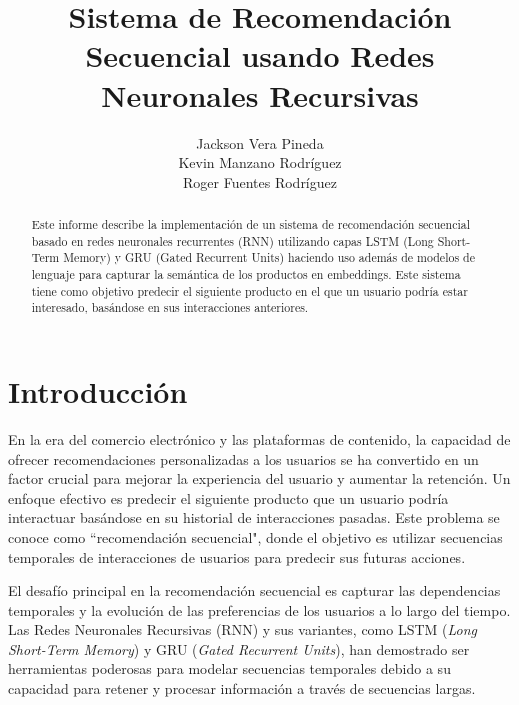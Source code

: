 \documentclass[runningheads]{llncs}
\begin{document}
\title{Sistema de Recomendación Secuencial usando Redes Neuronales Recursivas}
\author{Jackson Vera Pineda \\ Kevin Manzano Rodríguez \\ Roger Fuentes Rodríguez}

\maketitle

\begin{abstract}
Este informe describe la implementación de un sistema de recomendación secuencial basado en redes neuronales recurrentes (RNN) utilizando capas LSTM (Long Short-Term Memory) y GRU (Gated Recurrent Units) haciendo uso además de modelos de lenguaje para capturar la semántica de los productos en embeddings. Este sistema tiene como objetivo predecir el siguiente producto en el que un usuario podría estar interesado, basándose en sus interacciones anteriores.
\end{abstract}

\section{Introducción}

\space En la era del comercio electrónico y las plataformas de contenido, la capacidad de ofrecer recomendaciones personalizadas a los usuarios se ha convertido en un factor crucial para mejorar la experiencia del usuario y aumentar la retención. Un enfoque efectivo es predecir el siguiente producto que un usuario podría interactuar basándose en su historial de interacciones pasadas. Este problema se conoce como ``recomendación secuencial", donde el objetivo es utilizar secuencias temporales de interacciones de usuarios para predecir sus futuras acciones.

El desafío principal en la recomendación secuencial es capturar las dependencias temporales y la evolución de las preferencias de los usuarios a lo largo del tiempo. Las Redes Neuronales Recursivas (RNN) y sus variantes, como LSTM (\textit{Long Short-Term Memory}) y GRU (\textit{Gated Recurrent Units}), han demostrado ser herramientas poderosas para modelar secuencias temporales debido a su capacidad para retener y procesar información a través de secuencias largas.
\end{document}
